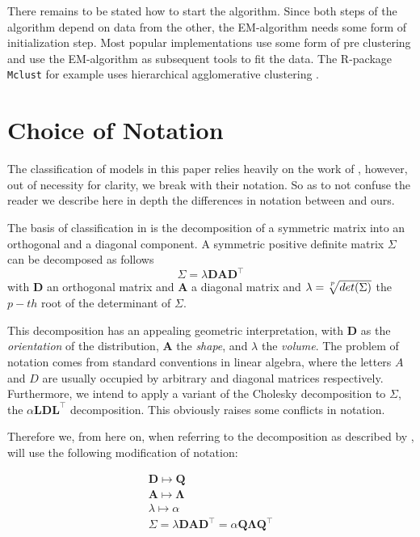 There remains to be stated how to start the algorithm. Since both steps of the
algorithm depend on data from the other, the EM-algorithm needs some form of 
initialization step.
Most popular implementations use some form of pre clustering and use the 
EM-algorithm as subsequent tools to fit the data. The R-package {\tt Mclust} 
for example uses hierarchical agglomerative clustering \cite{Scr16}.



\section{Choice of Notation}

The classification of models in this paper relies heavily on the work of 
\cite{Cel95}, however, out of necessity for clarity, we break with their 
notation. 
So as to not confuse the reader we describe here in depth the differences in 
notation between \cite{Cel95} and ours.

The basis of classification in \cite{Cel95} is the decomposition of a
symmetric matrix into an orthogonal and a diagonal component.
A symmetric positive definite matrix $ \Sigma $ can be decomposed as follows
    \[ \Sigma = \lambda \pmb{D} \pmb{A} \pmb{D}^{\top} \]
with $ \pmb{D} $ an orthogonal matrix and $ \pmb{A} $ a diagonal matrix and
$ \lambda = \sqrt[\uproot{3}p]{det(\Sigma)} $ the $ p-th $ root of the 
determinant of $ \Sigma $.

This decomposition has an appealing geometric interpretation, with $ \pmb{D} $ 
as the \textit{orientation} of the distribution, $ \pmb{A} $ the \textit{shape},
and $ \lambda $ the \textit{volume}. The problem of notation comes from standard 
conventions in linear algebra, where the letters $A$ and $D$ are usually 
occupied by arbitrary and diagonal matrices respectively. Furthermore, we intend
to apply a variant of the Cholesky decomposition to $ \Sigma $, the 
$ \alpha\pmb{L}\pmb{D}\pmb{L}^{\top} $ decomposition. This obviously raises some
conflicts in notation.

Therefore we, from here on, when referring to the decomposition as described by 
\cite{Cel95}, will use the following modification of notation:

\begin{gather*} 
    \pmb{D} \longmapsto \pmb{Q} \\
    \pmb{A} \longmapsto \pmb{\Lambda} \\
    \lambda \longmapsto \alpha  \\
    \Sigma = \lambda \pmb{D} \pmb{A} \pmb{D}^\top =
        \alpha \pmb{Q} \pmb{\Lambda} \pmb{Q}^\top
\end{gather*}

